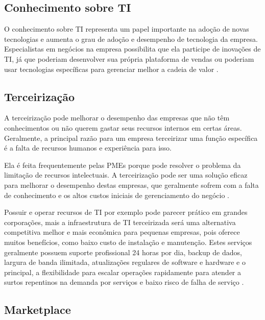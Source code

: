 \subsection{Conhecimento sobre TI}
\label{subsec:conhecimentoti}

O conhecimento sobre TI representa um papel importante na adoção de novas tecnologias e aumenta o grau de adoção e desempenho de tecnologia da empresa. Especialistas em negócios na empresa possibilita que ela participe de inovações de TI, já que poderiam desenvolver sua própria plataforma de vendas ou poderiam usar tecnologias específicas para gerenciar melhor a cadeia de valor \cite{criticalfactors2012}.

\subsection{Terceirização}
\label{subsec:terceirizacao}

A terceirização pode melhorar o desempenho das empresas que não têm conhecimentos ou não querem gastar seus recursos internos em certas áreas. Geralmente, a principal razão para um empresa terceirizar uma função específica é a falta de recursos humanos e experiência para isso.

Ela é feita frequentemente pelas PMEs porque pode resolver o problema da limitação de recursos intelectuais. A terceirização pode ser uma solução eficaz para melhorar o desempenho destas empresas, que geralmente sofrem com a falta de conhecimento e os altos custos iniciais de gerenciamento do negócio \cite{criticalfactors2012}. 

Possuir e operar recursos de TI por exemplo pode parecer prático em grandes corporações, mais a infraestrutura de TI terceirizada será uma alternativa competitiva melhor e mais econômica para pequenas empresas, pois oferece muitos benefícios, como baixo custo de instalação e manutenção. Estes serviços geralmente possuem suporte profissional 24 horas por dia, backup de dados, largura de banda ilimitada, atualizações regulares de software e hardware e o principal, a flexibilidade para escalar operações rapidamente para atender a surtos repentinos na demanda por serviços e baixo risco de falha de serviço \cite{terc2009}.

\subsection{Marketplace}
\label{subsec:framing}

